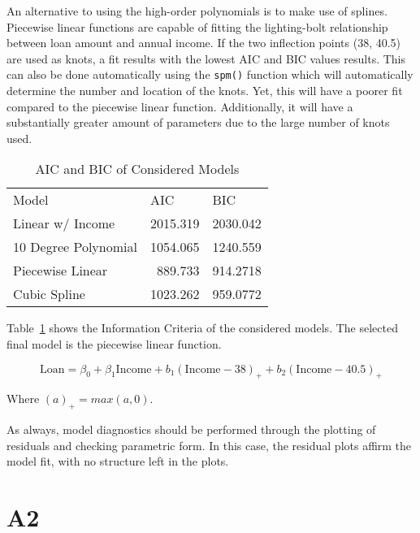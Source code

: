 An alternative to using the high-order polynomials is to make use of splines. Piecewise linear functions are capable of fitting the lighting-bolt relationship between loan amount and annual income. If the two inflection points (38, 40.5) are used as knots, a fit results with the lowest AIC and BIC values results. This can also be done automatically using the \lstinline{spm()} function which will automatically determine the number and location of the knots. Yet, this will have a poorer fit compared to the piecewise linear function. Additionally, it will have a substantially greater amount of parameters due to the large number of knots used. 

\begin{table}[htbp]
  \centering
    \begin{tabular}{lrr}
    Model & \multicolumn{1}{l}{AIC} & \multicolumn{1}{l}{BIC} \\
    Linear w/ Income & 2015.319 & 2030.042 \\
    10 Degree Polynomial & 1054.065 & 1240.559 \\
    Piecewise Linear & 889.733 & 914.2718 \\
    Cubic Spline & 1023.262 & 959.0772 \\
    \end{tabular}%
  \caption{AIC and BIC of Considered Models}
  \label{a1_tab}%
\end{table}%


Table~\ref{a1_tab} shows the Information Criteria of the considered models. The selected final model is the piecewise linear function. 

$$\text{Loan} = \beta_0 + \beta_1\text{Income} + b_1(\text{Income} - 38)_+ + b_2(\text{Income} - 40.5)_+ $$

Where $(a)_+ = max(a, 0)$. 

As always, model diagnostics should be performed through the plotting of residuals and checking parametric form. In this case, the residual plots affirm the model fit, with no structure left in the plots. 


\section{A2}



